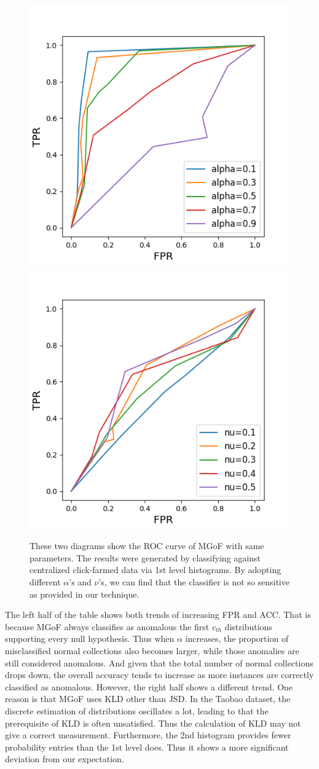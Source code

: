 \documentclass[10pt,conference,letterpaper]{IEEEtran}
\begin{document}
		\begin{figure}[!t]
			\centering
			\includegraphics[width=0.49\linewidth]{fig/ROC-Alpha-MGOF.png}
			\includegraphics[width=0.49\linewidth]{fig/ROC-Nu-MGOF.png}
			\caption{These two diagrams show the ROC curve of MGoF with same parameters. The results were generated by classifying against centralized click-farmed data via 1st level histograms. By adopting different $\alpha$'s and $\nu$'s, we can find that the classifier is not so sensitive as provided in our technique.}
			\label{fig:roc-mgof}
		\end{figure}
		
		The left half of the table shows both trends of increasing FPR and ACC. That is because MGoF always classifies as anomalous the first $c_{th}$ distributions supporting every null hypothesis. Thus when $\alpha$ increases, the proportion of misclassified normal collections also becomes larger, while those anomalies are still considered anomalous. And given that the total number of normal collections drops down, the overall accuracy tends to increase as more instances are correctly classified as anomalous. However, the right half shows a different trend. One reason is that MGoF uses KLD other than JSD. In the Taobao dataset, the discrete estimation of distributions oscillates a lot, leading to that the prerequisite of KLD is often unsatisfied. Thus the calculation of KLD may not give a correct measurement. Furthermore, the 2nd histogram provides fewer probability entries than the 1st level does. Thus it shows a more significant deviation from our expectation.
		
\end{document}
